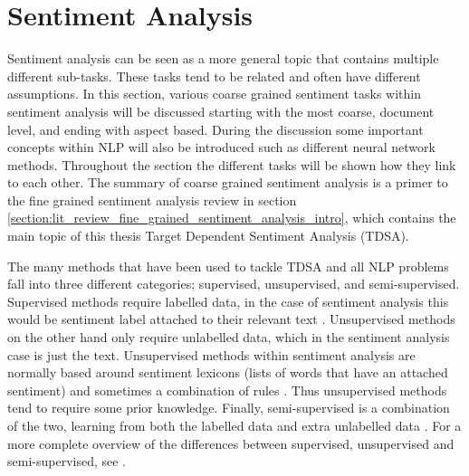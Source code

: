 \section{Sentiment Analysis}
Sentiment analysis can be seen as a more general topic that contains multiple different sub-tasks. These tasks tend to be related and often have different assumptions. In this section, various coarse grained sentiment tasks within sentiment analysis will be discussed starting with the most coarse, document level, and ending with aspect based. During the discussion some important concepts within NLP will also be introduced such as different neural network methods. Throughout the section the different tasks will be shown how they link to each other. The summary of coarse grained sentiment analysis is a primer to the fine grained sentiment analysis review in section \ref{section:lit_review_fine_grained_sentiment_analysis_intro}, which contains the main topic of this thesis Target Dependent Sentiment Analysis (TDSA).


The many methods that have been used to tackle TDSA and all NLP problems fall into three different categories; supervised, unsupervised, and semi-supervised. Supervised methods require labelled data, in the case of sentiment analysis this would be sentiment label attached to their relevant text \citep{pang-etal-2002-thumbs}. Unsupervised methods on the other hand only require unlabelled data, which in the sentiment analysis case is just the text. Unsupervised methods within sentiment analysis are normally based around sentiment lexicons (lists of words that have an attached sentiment) \citep{hu2004mining} and sometimes a combination of rules \citep{Hutto2014VADERAP}. Thus unsupervised methods tend to require some prior knowledge. Finally, semi-supervised is a combination of the two, learning from both the labelled data and extra unlabelled data \citep{zhu2005semi}. For a more complete overview of the differences between supervised, unsupervised and semi-supervised, see \citet{Weston2007LargeScaleSL}.

